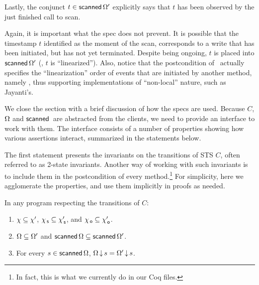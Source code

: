 Lastly, the conjunct $t \in \mathsf{scanned}\,\Omega'$ explicitly says
that $t$ has been observed by the just finished call to scan.

Again, it is important what the spec does not prevent. It is possible
that the timestamp $t$ identified as the moment of the scan,
corresponds to a write that has been initiated, but has not yet terminated.
Despite being ongoing, $t$ is placed into $\mathsf{scanned}\,\Omega'$
(\ie, $t$ is ``linearized''). Also, notice that the postcondition of
\jyscan\ actually specifies the ``linearization'' order of events that
are initiated by another method, namely \jywrite, thus supporting
implementations of ``non-local'' nature, such as Jayanti's.

We close the section with a brief discussion of how the specs are
used. Because $C$, $\Omega$ and $\scanned$ are abstracted from
the clients, we need to provide an interface to work with them. The
interface consists of a number of properties showing how various
assertions interact, summarized in the statements below.

The first statement presents the invariants on the transitions of STS
$C$, often referred to as 2-state invariants.
%
Another way of working with such invariants is to include them in the
postcondition of every method.\footnote{In fact, this is what we
  currently do in our Coq files.} For simplicity, here we agglomerate
the properties, and use them implicitly in proofs as needed.
%
\begin{invariant}\label{inv:mono}
In any program respecting the transitions of $C$: 
\begin{enumerate}
\item\label{inv:mono:hist} $\chi \subseteq \chi'$, $\chi_{\, \mathsf{s}} \subseteq
  \chi_{\, \mathsf{s}}'$, and $\chi_{\, \mathsf{o}} \subseteq \chi_{\, \mathsf{o}}'$.

\item \label{inv:mono:stable} $\Omega \subseteq \Omega'$
  and $\mathsf{scanned}\,\Omega \subseteq \mathsf{scanned}\,\Omega'$.

\item\label{inv:mono:ideal} For every $s \in \mathsf{scanned}\,\Omega$,
  $\Omega\,{\downarrow}\,s = \Omega'\,{\downarrow}\,s$.
\end{enumerate}
\end{invariant}


